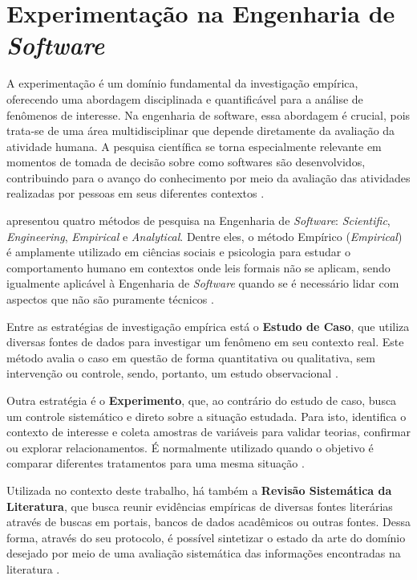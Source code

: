 \section{Experimentação na Engenharia de \textit{Software}}
\label{subsec:experimentacao}

A experimentação é um domínio fundamental da investigação empírica, oferecendo uma abordagem disciplinada e quantificável para a análise de fenômenos de interesse. Na engenharia de software, essa abordagem é crucial, pois trata-se de uma área multidisciplinar que depende diretamente da avaliação da atividade humana. A pesquisa científica se torna especialmente relevante em momentos de tomada de decisão sobre como softwares são desenvolvidos, contribuindo para o avanço do conhecimento por meio da avaliação das atividades realizadas por pessoas em seus diferentes contextos \cite{wohlin_experimentation_2012}.

 apresentou quatro métodos de pesquisa na Engenharia de \textit{Software}: \textit{Scientific}, \textit{Engineering}, \textit{Empirical} e \textit{Analytical}. Dentre eles, o método Empírico (\textit{Empirical}) é amplamente utilizado em ciências sociais e psicologia para estudar o comportamento humano em contextos onde leis formais não se aplicam, sendo igualmente aplicável à Engenharia de \textit{Software} quando se é necessário lidar com aspectos que não são puramente técnicos \cite{wohlin_experimentation_2012}.

Entre as estratégias de investigação empírica está o \textbf{Estudo de Caso}, que utiliza diversas fontes de dados para investigar um fenômeno em seu contexto real. Este método avalia o caso em questão de forma quantitativa ou qualitativa, sem intervenção ou controle, sendo, portanto, um estudo observacional \cite{runeson_case_study_2012}.

Outra estratégia é o \textbf{Experimento}, que, ao contrário do estudo de caso, busca um controle sistemático e direto sobre a situação estudada. Para isto, identifica o contexto de interesse e coleta amostras de variáveis para validar teorias, confirmar ou explorar relacionamentos. É normalmente utilizado quando o objetivo é comparar diferentes tratamentos para uma mesma situação \cite{wohlin_experimentation_2012}.

Utilizada no contexto deste trabalho, há também a \textbf{Revisão Sistemática da Literatura}, que busca reunir evidências empíricas de diversas fontes literárias através de buscas em portais, bancos de dados acadêmicos ou outras fontes. Dessa forma, através do seu protocolo, é possível sintetizar o estado da arte do domínio desejado por meio de uma avaliação sistemática das informações encontradas na literatura \cite{kitchenham_rsl}.

